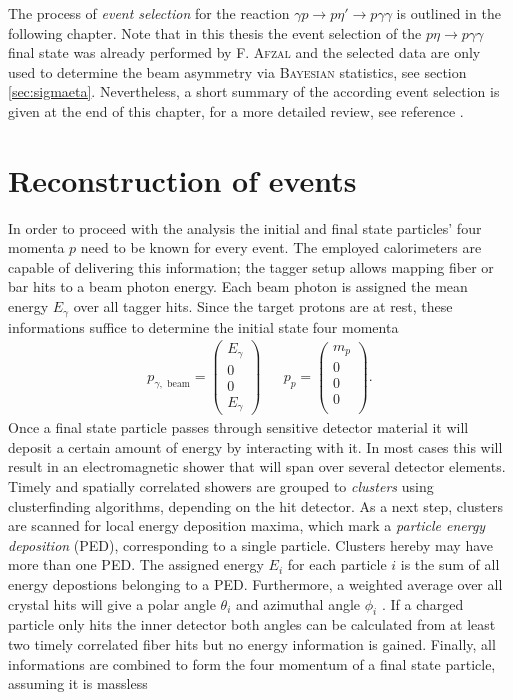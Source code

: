 \noindent The process of \emph{event selection} for the reaction $\gamma p \to p\eta'\to p\gamma\gamma$ is outlined in the following chapter. Note that in this thesis the event selection of the $p\eta\to p\gamma\gamma$ final state was already performed by \textsc{F. Afzal} \cite{farahphd} and the selected data are only used to determine the beam asymmetry via \textsc{Bayesian} statistics, see section \ref{sec:sigmaeta}. Nevertheless, a short summary of the according event selection is given at the end of this chapter, for a more detailed review, see reference \cite{farahphd}.
\section{Reconstruction of events}
In order to proceed with the analysis the initial and final state particles' four momenta $p$ need to be known for every event. The employed calorimeters are capable of delivering this information; the tagger setup allows mapping fiber or bar hits to a beam photon energy. Each beam photon is assigned the mean energy $E_\gamma$ over all tagger hits. Since the target protons are at rest, these informations suffice to determine the initial state four momenta
\begin{align}
	p_{\gamma,\text{ beam}}=\begin{pmatrix}
		E_\gamma\\0\\0\\E_\gamma 
	\end{pmatrix}
&&
 p_p=\begin{pmatrix}
	m_p\\0\\0\\0\\
\end{pmatrix} .
\end{align}
Once a final state particle passes through sensitive detector material it will deposit a certain amount of energy by interacting with it. In most cases this will result in an electromagnetic shower that will span over several detector elements. Timely and spatially correlated showers are grouped to \emph{clusters} using clusterfinding algorithms, depending on the hit detector. As a next step, clusters are scanned for local energy deposition maxima, which mark a \emph{particle energy deposition} (PED), corresponding to a single particle. Clusters hereby may have more than one PED. The assigned energy $E_i$ for each particle $i$ is the sum of all energy depostions belonging to a PED. Furthermore, a weighted average over all crystal hits will give a polar angle $\theta_i$ and azimuthal angle $\phi_i$ \cite{angles1}. If a charged particle only hits the inner detector both angles can be calculated from at least two timely correlated fiber hits \cite{angles2} but no energy information is gained. Finally, all informations are combined to form the four momentum of a final state particle, assuming it is massless
